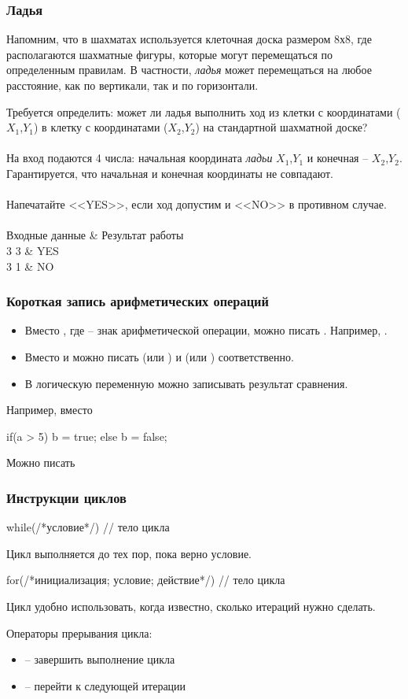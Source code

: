 \documentclass[PDF,10pt,usenames,dvipsnames,t,fragile]{beamer}
\newcommand{\inp}{\vspace{4pt}\\ \vspace{4pt}{\bf Входные данные} \\} %
\newcommand{\out}{\vspace{4pt}\\ \vspace{4pt}{\bf Результат работы} \\} %
\newcommand{\tb}{\\ \hline} %
\newenvironment{ex}{\vspace{4pt}\\ \vspace{4pt}{\bf Пример} \\
\tabularx{\textwidth}{|>{\tt}X|>{\tt}X|}
\hline \sf Входные данные & \sf Результат работы \tb}{\endtabularx}
\begin{document}
\begin{frame}
	\frametitle{Ладья}
	Напомним, что в шахматах используется клеточная доска размером 8х8, где
	располагаются шахматные фигуры, которые могут перемещаться по определенным
	правилам. В частности, {\it ладья} может перемещаться на любое расстояние, как по
	вертикали, так и по горизонтали.

	Требуется определить: может ли ладья выполнить ход из клетки с координатами
	($X_1$,$Y_1$) в клетку с координатами ($X_2$,$Y_2$) на стандартной шахматной доске? 
	\inp
	На вход подаются 4 числа: начальная координата {\it ладьи} $X_1$,$Y_1$ и конечная
	-- $X_2$,$Y_2$. Гарантируется, что начальная и конечная координаты не совпадают.
	\out
	Напечатайте <<YES>>, если ход допустим и <<NO>> в противном случае. 
	\begin{ex}
		4 3  3 & YES \tb
		4 3  1 & NO \tb
	\end{ex}
\end{frame}

\begin{frame}[fragile]
	\frametitle{Короткая запись арифметических операций}

	\begin{itemize}
		\item Вместо , где  -- знак арифметической операции,
	можно писать . Например, .
		\item Вместо  и  можно писать  (или
	) и  (или ) соответственно.
		\item В логическую переменную можно записывать результат сравнения.
	\end{itemize}
	Например, вместо
	\begin{code}
if(a > 5) b = true;
else b = false;
	\end{code}
	Можно писать \\
\end{frame}

\begin{frame}[fragile]
	\frametitle{Инструкции циклов}
	\begin{code}
while(/*условие*/)
{
	// тело цикла			
}
	\end{code}
	Цикл  выполняется до тех пор, пока верно условие.
	\begin{code}
for(/*инициализация; условие; действие*/)
{
	// тело цикла 		
}
	\end{code}
	Цикл  удобно использовать, когда известно, сколько итераций нужно
	сделать. \newline

	{\large Операторы прерывания цикла:}
	\begin{itemize}
		\item {} -- завершить выполнение цикла
		\item {} -- перейти к следующей итерации
	\end{itemize}
\end{frame}
\end{document}

